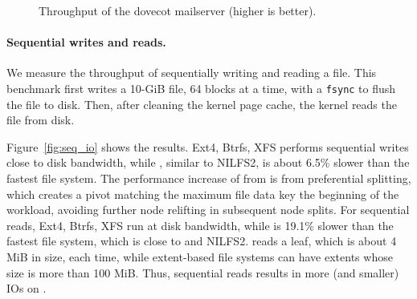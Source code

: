 \begin{figure}[t]
    \caption[Mailserver benchmark]{\label{fig:imap}
        Throughput of the dovecot mailserver (higher is better).}
\end{figure}

\paragraph{Sequential writes and reads.}

We measure the throughput of sequentially writing and reading a file.
This benchmark first writes a 10-GiB file, 64 blocks at a time, with a
\texttt{fsync} to flush the file to disk.
Then, after cleaning the kernel page cache, the kernel reads the file from disk.

Figure~\ref{fig:seq_io} shows the results.
Ext4, Btrfs, XFS performs sequential
writes close to disk bandwidth, while \betrfsFive, similar to NILFS2, is about
6.5\% slower than the fastest file system.
The performance increase of \betrfsFive from \betrfsFour is from preferential
splitting, which creates a pivot matching the maximum file data key the
beginning of the workload, avoiding further node relifting in subsequent node
splits.
For sequential reads, Ext4, Btrfs, XFS run at disk bandwidth, while \betrfsFive
is 19.1\% slower than the fastest file system, which is close to \betrfsFour
and NILFS2.
\betrfs reads a leaf, which is about 4 MiB in size, each time, while
extent-based file systems can have extents whose size is more than 100 MiB.
Thus, sequential reads results in more (and smaller) IOs on \betrfs.

